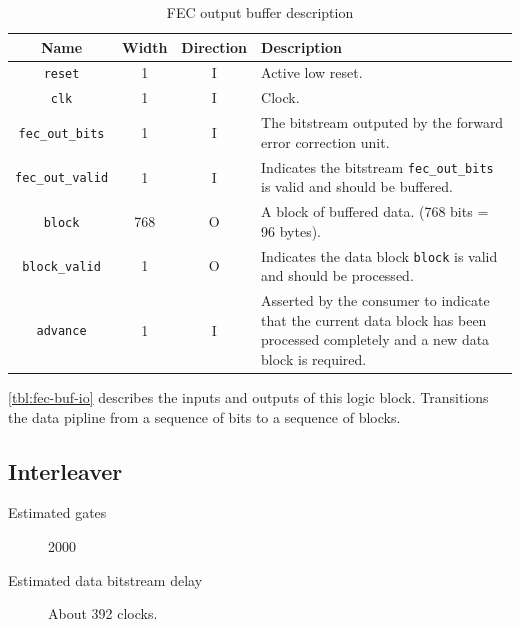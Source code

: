 \documentclass[dvips,10pt,twocolumn]{article}
\newcommand{\wire}{\texttt}
\begin{document}
\begin{table} \begin{tabularx}{\linewidth}{c|c|c|X}
	\label{tbl:fec-buf-io}
	Name & Width & Direction & Description \\ \hline

	\wire{reset} & 1 & I & Active low reset. \\

	\wire{clk} & 1 & I & Clock. \\

	\wire{fec\_out\_bits} & 1 & I & The bitstream outputed by the
	forward error correction unit. \\

	\wire{fec\_out\_valid} & 1 & I & Indicates the bitstream
	\wire{fec\_out\_bits} is valid and should be buffered. \\


	\wire{block} & 768 & O & A block of buffered data. (768 bits = 96
	bytes). \\

	\wire{block\_valid} & 1 & O & Indicates the data block
	\wire{block} is valid and should be processed. \\

	\wire{advance} & 1 & I & Asserted by the consumer to indicate that
	the current data block has been processed completely and a new data
	block is required. \\

\end{tabularx} \caption{FEC output buffer description} \end{table}

\autoref{tbl:fec-buf-io} describes the inputs and outputs of this logic
block.
Transitions the data pipline from a sequence of bits to a sequence of
blocks.


\subsection{Interleaver}
\label{sec:interleaver}
\begin{description}
	\item[Estimated gates] 2000
	\item[Estimated data bitstream delay] About 392 clocks.
\end{description}
	
\end{document}
